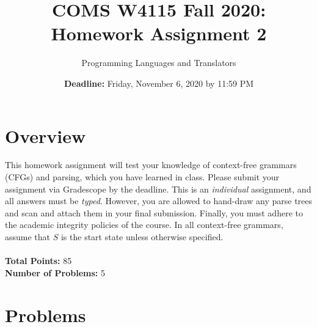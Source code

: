 \documentclass{article}[12pt]
\title{COMS W4115 Fall 2020: Homework Assignment 2}
\author{Programming Languages and Translators}
\date{\textbf{Deadline:} Friday, November 6, 2020 by 11:59 PM}
\begin{document}
\maketitle

\section*{Overview}

This homework assignment will test your knowledge of context-free grammars (CFGs) and parsing, which you have learned in class. Please submit your assignment via Gradescope by the deadline. This is an \textit{individual} assignment, and all answers must be \textit{typed}. However, you are allowed to hand-draw any parse trees and scan and attach them in your final submission. Finally, you must adhere to the academic integrity policies of the course. In all context-free grammars, assume that $S$ is the start state unless otherwise specified.\\\\\textbf{Total Points:} 85\\\textbf{Number of Problems:} 5

\section*{Problems}
\end{document}
